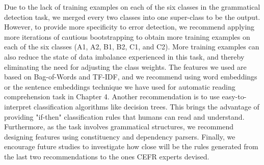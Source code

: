 Due to the lack of training examples on each of the six classes in the grammatical detection task, we merged every two classes into one super-class to be the output. However, to provide more specificity to error detection, we recommend applying more iterations of cautious bootstrapping to obtain more training examples on each of the six classes (A1, A2, B1, B2, C1, and C2). More training examples can also reduce the state of data imbalance experienced in this task, and thereby eliminating the need for adjusting the class weights. The features we used are based on Bag-of-Words and TF-IDF, and we recommend using word embeddings or the sentence embeddings technique we have used for automatic reading comprehension task in Chapter 4. Another recommendation is to use easy-to-interpret classification algorithms like decision trees. This brings the advantage of providing "if-then" classification rules that humans can read and understand. Furthermore, as the task involves grammatical structures, we recommend designing features using constituency and dependency parsers. Finally, we encourage future studies to investigate how close will be the rules generated from the last two recommendations to the ones CEFR experts devised. 


